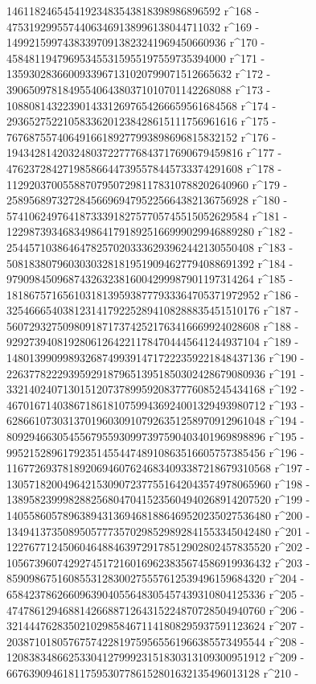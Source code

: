        14611824654541923483543818398986896592 r^168 - 
       47531929955744063469138996138044711032 r^169 - 
       149921599743833970913823241969450660936 r^170 - 
       458481194796953455315955197559735394000 r^171 - 
       1359302836600933967131020799071512665632 r^172 - 
       3906509781849554064380371010701142268088 r^173 - 
       10880814322390143312697654266659561684568 r^174 - 
       29365275221058336201238428615111756961616 r^175 - 
       76768755740649166189277993898696815832152 r^176 - 
       194342814203248037227776843717690679459816 r^177 - 
       476237284271985866447395578445733374291608 r^178 - 
       1129203700558870795072981178310788202640960 r^179 - 
       2589568973272845669694795225664382136756928 r^180 - 
       5741062497641873339182757705745515052629584 r^181 - 
       12298739346834986417918925166999029946889280 r^182 - 
       25445710386464782570203336293962442130550408 r^183 - 
       50818380796030303281819519094627794088691392 r^184 - 
       97909845096874326323816004299987901197314264 r^185 - 
       181867571656103181395938777933364705371972952 r^186 - 
       325466654038123141792252894108288835451510176 r^187 - 
       560729327509809187173742521763416669924028608 r^188 - 
       929273940819280612642211784704445641244937104 r^189 - 
       1480139909989326874993914717222359221848437136 r^190 - 
       2263778222939592918796513951850302428679080936 r^191 - 
       3321402407130151207378995920837776085245434168 r^192 - 
       4670167140386718618107599436924001329493980712 r^193 - 
       6286610730313701960309107926351258970912961048 r^194 - 
       8092946630545567955930997397590403401969898896 r^195 - 
       9952152896179235145544748910863516605757385456 r^196 - 
       11677269378189206946076246834093387218679310568 r^197 - 
       13057182004964215309072377551642043574978065960 r^198 - 
       13895823999828825680470415235604940268914207520 r^199 - 
       14055860578963894313694681886469520235027536480 r^200 - 
       13494137350895057773570298529892841553345042480 r^201 - 
       12276771245060464884639729178512902802457835520 r^202 - 
       10567396074292745172160169623835674586919936432 r^203 - 
       8590986751608553128300275557612539496159684320 r^204 - 
       6584237862660963904055648305457439310804125336 r^205 - 
       4747861294688142668871264315224870728504940760 r^206 - 
       3214447628350210298584671141808295937591123624 r^207 - 
       2038710180576757422819759565561966385573495544 r^208 - 
       1208383486625330412799923151830313109300951912 r^209 - 
       667639094618117595307786152801632135496013128 r^210 - 
